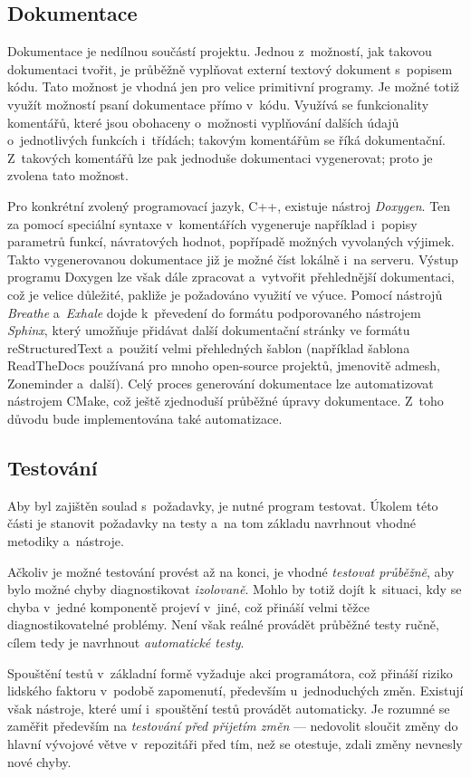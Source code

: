 \subsection{Dokumentace}
Dokumentace je nedílnou součástí projektu. Jednou z~možností, jak takovou dokumentaci tvořit, je průběžně vyplňovat externí textový dokument s~popisem kódu. Tato možnost je vhodná jen pro velice primitivní programy. Je možné totiž využít možností psaní dokumentace přímo v~kódu. Využívá se funkcionality komentářů, které jsou obohaceny o~možnosti vyplňování dalších údajů o~jednotlivých funkcích i~třídách; takovým komentářům se říká dokumentační. Z~takových komentářů lze pak jednoduše dokumentaci vygenerovat; proto je zvolena tato možnost.

Pro konkrétní zvolený programovací jazyk, C++, existuje nástroj \emph{Doxygen}. Ten za pomocí speciální syntaxe v~komentářích vygeneruje například i~popisy parametrů funkcí, návratových hodnot, popřípadě možných vyvolaných výjimek. Takto vygenerovanou dokumentace již je možné číst lokálně i~na serveru. Výstup programu Doxygen lze však dále zpracovat a~vytvořit přehlednější dokumentaci, což je velice důležité, pakliže je požadováno využití ve výuce. Pomocí nástrojů \emph{Breathe} a~\emph{Exhale} dojde k~převedení do formátu podporovaného nástrojem \emph{Sphinx}, který umožňuje přidávat další dokumentační stránky ve formátu reStructuredText a~použití velmi přehledných šablon (například šablona ReadTheDocs používaná pro mnoho open-source projektů, jmenovitě admesh, Zoneminder a~další). Celý proces generování dokumentace lze automatizovat nástrojem CMake, což ještě zjednoduší průběžné úpravy dokumentace. Z~toho důvodu bude implementována také automatizace.

\subsection{Testování}
Aby byl zajištěn soulad s~požadavky, je nutné program testovat. Úkolem této části je stanovit požadavky na testy a~na tom základu navrhnout vhodné metodiky a~nástroje.

Ačkoliv je možné testování provést až na konci, je vhodné \emph{testovat průběžně}, aby bylo možné chyby diagnostikovat \emph{izolovaně}. Mohlo by totiž dojít k~situaci, kdy se chyba v~jedné komponentě projeví v~jiné, což přináší velmi těžce diagnostikovatelné problémy. Není však reálné provádět průběžné testy ručně, cílem tedy je navrhnout \emph{automatické testy}.

Spouštění testů v~základní formě vyžaduje akci programátora, což přináší riziko lidského faktoru v~podobě zapomenutí, především u~jednoduchých změn. Existují však nástroje, které umí i~spouštění testů provádět automaticky. Je rozumné se zaměřit především na \emph{testování před přijetím změn} --- nedovolit sloučit změny do hlavní vývojové větve v~repozitáři před tím, než se otestuje, zdali změny nevnesly nové chyby.

